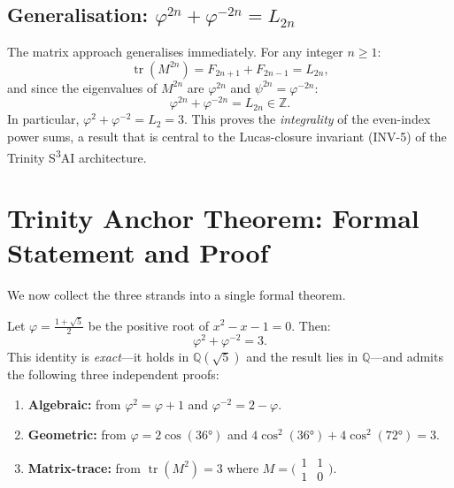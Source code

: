 \subsection{Generalisation: $\varphi^{2n}+\varphi^{-2n} = L_{2n}$}

The matrix approach generalises immediately.
For any integer $n \geq 1$:
\[
  \operatorname{tr}(M^{2n})
  = F_{2n+1}+F_{2n-1}
  = L_{2n},
\]
and since the eigenvalues of $M^{2n}$ are $\varphi^{2n}$ and
$\psi^{2n} = \varphi^{-2n}$:
\[
  \varphi^{2n}+\varphi^{-2n} = L_{2n} \in \mathbb{Z}.
\]
In particular, $\varphi^{2}+\varphi^{-2} = L_{2} = 3$.
This proves the \emph{integrality} of the even-index power sums,
a result that is central to the Lucas-closure invariant (INV-5)
of the Trinity S\textsuperscript{3}AI architecture.


\section{Trinity Anchor Theorem: Formal Statement and Proof}%
\label{sec:main-theorem}

We now collect the three strands into a single formal theorem.

\begin{theorem}%
\label{thm:trinity-anchor}
Let $\varphi = \tfrac{1+\sqrt{5}}{2}$ be the positive root of
$x^{2}-x-1=0$.
Then:
\[
  \varphi^{2} + \varphi^{-2} = 3.
\]
This identity is \emph{exact}---it holds in $\mathbb{Q}(\sqrt{5})$
and the result lies in $\mathbb{Q}$---and admits the following
three independent proofs:
\begin{enumerate}[label=(\Roman*)]
  \item \textbf{Algebraic:} from $\varphi^{2}=\varphi+1$ and
        $\varphi^{-2}=2-\varphi$.
  \item \textbf{Geometric:} from $\varphi=2\cos(36°)$ and
        $4\cos^{2}(36°)+4\cos^{2}(72°)=3$.
  \item \textbf{Matrix-trace:} from $\operatorname{tr}(M^{2})=3$
        where $M=\bigl(\begin{smallmatrix}1&1\\1&0\end{smallmatrix}\bigr)$.
\end{enumerate}
\end{theorem}


